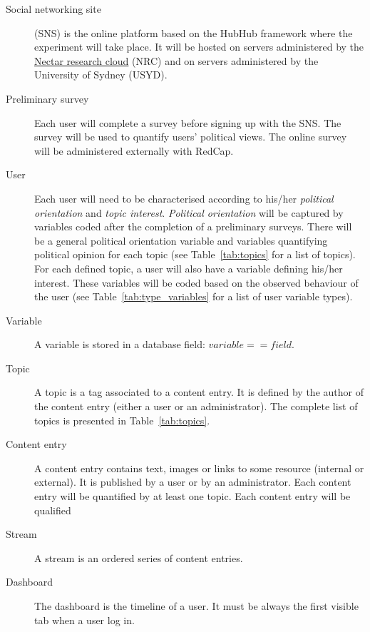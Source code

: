 \documentclass[a4paper]{article}
\begin{document}
\begin{description}

\item[Social networking site] (SNS) is the online platform based on the HubHub framework where the experiment will take place. It will be hosted on servers administered by the \href{https://nectar.org.au/research-cloud/}{Nectar research cloud} (NRC) and on servers administered by the University of Sydney (USYD).

\item[Preliminary survey] Each user will complete a survey before signing up with the SNS. The survey will be used to quantify users' political views. The online survey will be administered externally with RedCap. 

\item[User] Each user will need to be characterised according to his/her \textit{political orientation} and \textit{topic interest}. \textit{Political orientation} will be captured by variables coded after the completion of a preliminary surveys. There will be a general political orientation variable and variables quantifying political opinion for each topic (see Table~\ref{tab:topics} for a list of topics). For each defined topic, a user will also have a variable defining his/her interest. These variables will be coded based on the observed behaviour of the user (see Table~\ref{tab:type_variables} for a list of user variable types).

  \item[Variable] A variable is stored in a database field: $variable==field$.
  
\item[Topic] A topic is a tag associated to a content entry. It is defined by the author of the content entry (either a user or an administrator). The complete list of topics is presented in Table~\ref{tab:topics}.

\item[Content entry] A content entry contains text, images or links to some resource (internal or external). It is published by a user or by an administrator. Each content entry will be quantified by at least one topic. Each content entry will be qualified 

\item[Stream] A stream is an ordered series of content entries.

\item[Dashboard] The dashboard is the timeline of a user. It must be always the first visible tab when a user log in.
  
\end{description}
\end{document}
